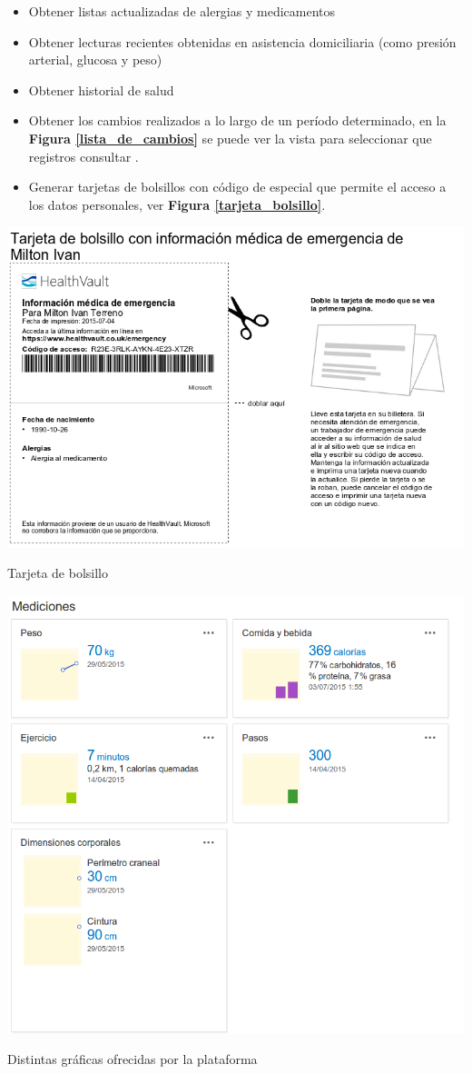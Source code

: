 \begin{itemize}
{\begin{itemize}
        \item Obtener listas actualizadas de alergias y medicamentos
		\item Obtener lecturas recientes obtenidas en asistencia domiciliaria (como presión arterial, glucosa y peso)
		\item Obtener historial de salud
        \item Obtener los cambios realizados a lo largo de un período determinado, en la \textbf{Figura \ref{lista_de_cambios}} se puede ver la vista para seleccionar que registros  consultar .
        \item Generar tarjetas de bolsillos con código de especial que permite el acceso a los datos personales, ver \textbf{Figura \ref{tarjeta_bolsillo}}.
	\end{itemize}
    
    \begin{correccionFigure}[h]
      \centering
      \includegraphics[width=.8\textwidth]{img/tp1/3-tarjeta_bolsillo}
      \caption{Tarjeta de bolsillo}
      \label{tarjeta_bolsillo}
    \end{correccionFigure} 
    
    \begin{correccionFigure}[h]
      \centering
      \includegraphics[width=.8\textwidth]{img/tp1/3-graficas}
      \caption{Distintas gráficas ofrecidas por la plataforma}
      \label{graficas}
    \end{correccionFigure} 
    
}
\end{itemize}
